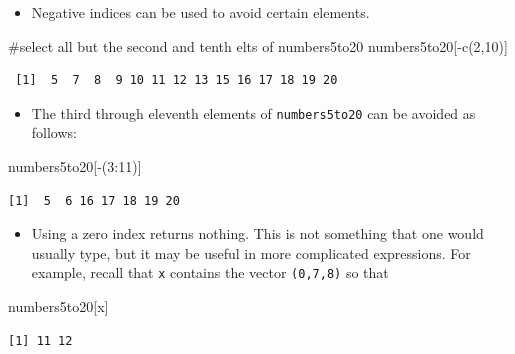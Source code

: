 \documentclass[
  9pt,
  a4paper,
  ignorenonframetext,
  notheorems]{beamer}
\newenvironment{Shaded}{\begin{snugshade}}{\end{snugshade}}
\newcommand{\CommentTok}[1]{\textcolor[rgb]{0.37,0.37,0.37}{#1}}
\newcommand{\DecValTok}[1]{\textcolor[rgb]{0.68,0.00,0.00}{#1}}
\newcommand{\FunctionTok}[1]{\textcolor[rgb]{0.28,0.35,0.67}{#1}}
\newcommand{\NormalTok}[1]{\textcolor[rgb]{0.00,0.23,0.31}{#1}}
\newcommand{\SpecialCharTok}[1]{\textcolor[rgb]{0.37,0.37,0.37}{#1}}
\providecommand{\tightlist}{%
  \setlength{\itemsep}{0pt}\setlength{\parskip}{0pt}}\usepackage{longtable,booktabs,array}
\begin{document}
\begin{frame}[fragile]
\begin{itemize}
\tightlist
\item
  Negative indices can be used to avoid certain elements.
\end{itemize}

\begin{Shaded}
\begin{Highlighting}[]
\CommentTok{\#select all but the second and tenth elts of \textasciigrave{}numbers5to20\textasciigrave{}}
\NormalTok{numbers5to20[}\SpecialCharTok{{-}}\FunctionTok{c}\NormalTok{(}\DecValTok{2}\NormalTok{,}\DecValTok{10}\NormalTok{)]}
\end{Highlighting}
\end{Shaded}

\begin{verbatim}
 [1]  5  7  8  9 10 11 12 13 15 16 17 18 19 20
\end{verbatim}

\begin{itemize}
\tightlist
\item
  The third through eleventh elements of \texttt{numbers5to20} can be
  avoided as follows:
\end{itemize}

\begin{Shaded}
\begin{Highlighting}[]
\NormalTok{numbers5to20[}\SpecialCharTok{{-}}\NormalTok{(}\DecValTok{3}\SpecialCharTok{:}\DecValTok{11}\NormalTok{)]}
\end{Highlighting}
\end{Shaded}

\begin{verbatim}
[1]  5  6 16 17 18 19 20
\end{verbatim}

\begin{itemize}
\tightlist
\item
  Using a zero index returns nothing. This is not something that one
  would usually type, but it may be useful in more complicated
  expressions. For example, recall that \texttt{x} contains the vector
  \texttt{(0,7,8)} so that
\end{itemize}

\begin{Shaded}
\begin{Highlighting}[]
\NormalTok{numbers5to20[x]}
\end{Highlighting}
\end{Shaded}

\begin{verbatim}
[1] 11 12
\end{verbatim}
\end{frame}
\end{document}
